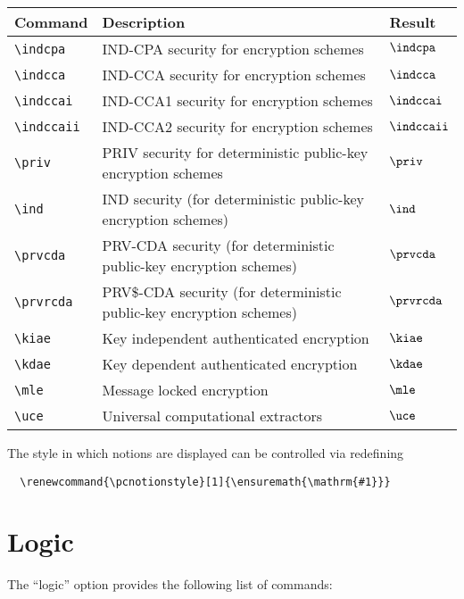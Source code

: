 \documentclass[a4paper]{report}
\begin{document}
  \begin{center}
  \begin{tabular}{l l l}
  \textbf{Command} & \textbf{Description} & \textbf{Result} \\\hline
  \lstinline$\indcpa$ & IND-CPA security for encryption schemes & $\indcpa$  \\
  \lstinline$\indcca$ & IND-CCA security for encryption schemes & $\indcca$  \\
  \lstinline$\indccai$ & IND-CCA1 security for encryption schemes & $\indccai$  \\
  \lstinline$\indccaii$ &  IND-CCA2 security for encryption schemes & $\indccaii$  \\
  \lstinline$\priv$ & PRIV security for deterministic public-key encryption schemes & $\priv$  \\
  \lstinline$\ind$ & IND security (for deterministic public-key encryption schemes) & $\ind$  \\
  \lstinline$\prvcda$ & PRV-CDA security (for deterministic public-key encryption schemes)& $\prvcda$  \\
  \lstinline$\prvrcda$ & PRV\$-CDA security (for deterministic public-key encryption schemes) & $\prvrcda$  \\
  \lstinline$\kiae$ & Key independent authenticated encryption & $\kiae$  \\
  \lstinline$\kdae$ & Key dependent authenticated encryption & $\kdae$  \\
  \lstinline$\mle$ & Message locked encryption & $\mle$  \\
  \lstinline$\uce$ & Universal computational extractors & $\uce$  \\
  \end{tabular}
  \end{center}
  
  The style in which notions are displayed can be controlled via redefining
  \begin{lstlisting}
  \renewcommand{\pcnotionstyle}[1]{\ensuremath{\mathrm{#1}}}
  \end{lstlisting}
  
  \section{Logic}
  The \enquote{logic} option provides the following list of commands:
  
\end{document}
